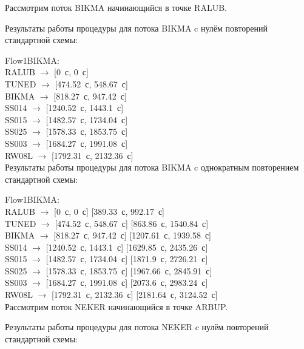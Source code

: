 \documentclass[12pt]{article}
\theoremstyle{plain}
\begin{document}
Рассмотрим поток BIKMA начинающийся в точке RALUB.

Результаты работы процедуры для потока BIKMA c нулём повторений стандартной схемы:

\noindent Flow1BIKMA:\\
RALUB $\rightarrow$ [0~с, 0~с]\\
TUNED $\rightarrow$ [474.52~с, 548.67~с]\\
BIKMA $\rightarrow$ [818.27~с, 947.42~с]\\
SS014 $\rightarrow$ [1240.52~с, 1443.1~с]\\
SS015 $\rightarrow$ [1482.57~с, 1734.04~с]\\
SS025 $\rightarrow$ [1578.33~с, 1853.75~с]\\
SS003 $\rightarrow$ [1684.27~с, 1991.08~с]\\
RW08L $\rightarrow$ [1792.31~с, 2132.36~с]\\


Результаты работы процедуры для потока BIKMA c однократным повторением стандартной схемы:

\noindent Flow1BIKMA:\\
RALUB $\rightarrow$ [0~с, 0~с] [389.33~с, 992.17~с]\\
TUNED $\rightarrow$ [474.52~с, 548.67~с] [863.86~с, 1540.84~с]\\
BIKMA $\rightarrow$ [818.27~с, 947.42~с] [1207.61~с, 1939.58~с]\\
SS014 $\rightarrow$ [1240.52~с, 1443.1~с] [1629.85~с, 2435.26~с]\\
SS015 $\rightarrow$ [1482.57~с, 1734.04~с] [1871.9~с, 2726.21~с]\\
SS025 $\rightarrow$ [1578.33~с, 1853.75~с] [1967.66~с, 2845.91~с]\\
SS003 $\rightarrow$ [1684.27~с, 1991.08~с] [2073.6~с, 2983.24~с]\\
RW08L $\rightarrow$ [1792.31~с, 2132.36~с] [2181.64~с, 3124.52~с]\\


Рассмотрим поток NEKER начинающийся в точке ARBUP.

Результаты работы процедуры для потока NEKER c нулём повторений стандартной схемы:
\end{document}
